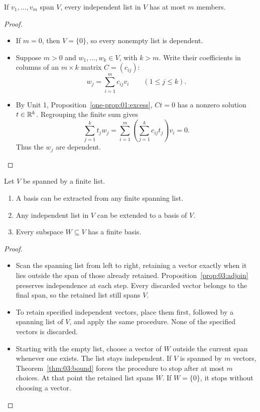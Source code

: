 \begin{theorem}\label{thm:03:bound}
If \(v_1,\ldots,v_m\) span \(V\), every independent list in \(V\)
has at most \(m\) members.
\end{theorem}
\begin{proof}
\begin{itemize}
\item If \(m=0\), then \(V=\{0\}\), so every nonempty list is dependent.
\item Suppose \(m>0\) and \(w_1,\ldots,w_k\in V\), with \(k>m\). Write their coefficients
in columns of an \(m\times k\) matrix \(C=(c_{ij})\):
\[
w_j=\sum_{i=1}^m c_{ij}v_i\qquad(1\leqslant j\leqslant k).
\]
\item By Unit 1, Proposition~\ref{one-prop:01:excess}, \(Ct=0\) has a nonzero
solution \(t\in\mathbb R^k\). Regrouping the finite sum gives
\[
\sum_{j=1}^k t_jw_j
=\sum_{i=1}^m\left(\sum_{j=1}^k c_{ij}t_j\right)v_i=0.
\]
Thus the \(w_j\) are dependent.
\end{itemize}
\end{proof}

\begin{theorem}\label{thm:03:extract}
Let \(V\) be spanned by a finite list.
\begin{enumerate}
\item A basis can be extracted from any finite spanning list.
\item Any independent list in \(V\) can be extended to a basis of \(V\).
\item Every subspace \(W\subseteq V\) has a finite basis.
\end{enumerate}
\end{theorem}
\begin{proof}
\begin{itemize}
\item Scan the spanning list from left to right, retaining a vector exactly
when it lies outside the span of those already retained.
Proposition~\ref{prop:03:adjoin} preserves independence at each step.
Every discarded vector belongs to the final span, so the retained list
still spans \(V\).
\item To retain specified independent vectors, place them first, followed
by a spanning list of \(V\), and apply the same procedure. None of the
specified vectors is discarded.
\item Starting with the empty list, choose a vector of \(W\) outside the
current span whenever one exists. The list stays independent.
If \(V\) is spanned by \(m\) vectors, Theorem~\ref{thm:03:bound}
forces the procedure to stop after at most \(m\) choices.
At that point the retained list spans \(W\). If \(W=\{0\}\), it stops
without choosing a vector.
\end{itemize}
\end{proof}

